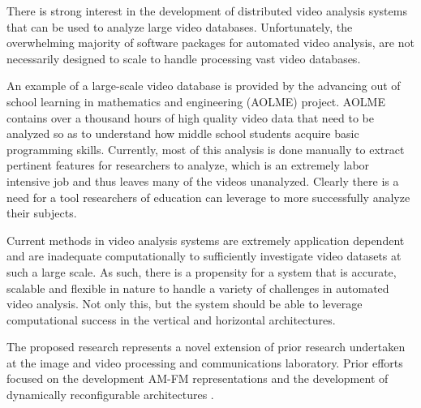 
\PARstart There is strong interest in the development of distributed video analysis
systems that can be used to analyze large video databases. Unfortunately, the
overwhelming majority of software packages for automated video analysis, are not
necessarily designed to scale  to handle processing  vast video
databases.

An example of a large-scale video database is  provided by the advancing out of
school learning in mathematics and engineering (AOLME) project. AOLME contains
over a thousand hours of high quality video data that need to be analyzed so as
to understand how middle school students acquire basic programming skills.
Currently, most of this analysis is done manually \cite{LopezLeiva2016} to
extract pertinent features for researchers to analyze, which is an extremely
labor intensive job and thus leaves many of the videos unanalyzed. Clearly
there is a need for a tool researchers of education can leverage to
more successfully analyze their subjects.

Current methods in video analysis systems are extremely application dependent
and are inadequate computationally to sufficiently
investigate video datasets at such a large scale. As such, there is a propensity
for a system that is accurate, scalable and flexible in nature to handle a
variety of challenges in automated video analysis. Not only this, but the system
should be able to leverage computational success in the vertical and horizontal
architectures.



The proposed research represents a novel extension of prior research undertaken
at the image and video processing and communications laboratory. Prior efforts
focused on the development AM-FM representations \cite{5378645} \cite{Cesar2012}
\cite{6693707} \cite{loizou2014despeckle} \cite{agurto2011automatic}
\cite{5590295} \cite{5414522} \cite{5405648} \cite{murray2012} \cite{4135672}
\cite{908521} \cite{765139} \cite{janakiramanan2011tree} \cite{985561}
\cite{931092} \cite{923291} \cite{758405} and the development of dynamically
reconfigurable architectures \cite{Carranza2016} \cite{llamocca2014dynamic}
\cite{7418203} \cite{7015949} \cite{jiang2014dynamically} \cite{6806021}
\cite{6810466}.

